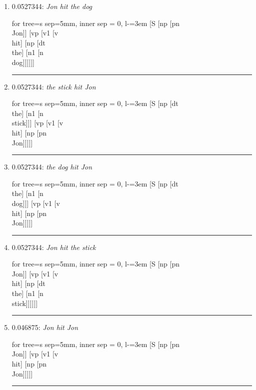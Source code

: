 \documentclass[11pt]{article}
\begin{document}
\begin{enumerate}
	\item  0.0527344: \textit{Jon hit the dog} \\[0.5em]
	\begin{forest}
	for tree={s sep=5mm, inner sep = 0, l-=3em}
	[S [np [pn\\Jon]] [vp [v1 [v\\hit] [np [dt\\the] [n1 [n\\dog]]]]]]
	\end{forest}
	\vspace{2\baselineskip}
	\hrule

	\item  0.0527344: \textit{the stick hit Jon} \\[0.5em]
	\begin{forest}
	for tree={s sep=5mm, inner sep = 0, l-=3em}
	[S [np [dt\\the] [n1 [n\\stick]]] [vp [v1 [v\\hit] [np [pn\\Jon]]]]]
	\end{forest}
	\vspace{2\baselineskip}
	\hrule

	\item  0.0527344: \textit{the dog hit Jon} \\[0.5em]
	\begin{forest}
	for tree={s sep=5mm, inner sep = 0, l-=3em}
	[S [np [dt\\the] [n1 [n\\dog]]] [vp [v1 [v\\hit] [np [pn\\Jon]]]]]
	\end{forest}
	\vspace{2\baselineskip}
	\hrule

	\item  0.0527344: \textit{Jon hit the stick} \\[0.5em]
	\begin{forest}
	for tree={s sep=5mm, inner sep = 0, l-=3em}
	[S [np [pn\\Jon]] [vp [v1 [v\\hit] [np [dt\\the] [n1 [n\\stick]]]]]]
	\end{forest}
	\vspace{2\baselineskip}
	\hrule

	\item  0.046875: \textit{Jon hit Jon} \\[0.5em]
	\begin{forest}
	for tree={s sep=5mm, inner sep = 0, l-=3em}
	[S [np [pn\\Jon]] [vp [v1 [v\\hit] [np [pn\\Jon]]]]]
	\end{forest}
	\vspace{2\baselineskip}
	\hrule


\end{enumerate}
\end{document}
